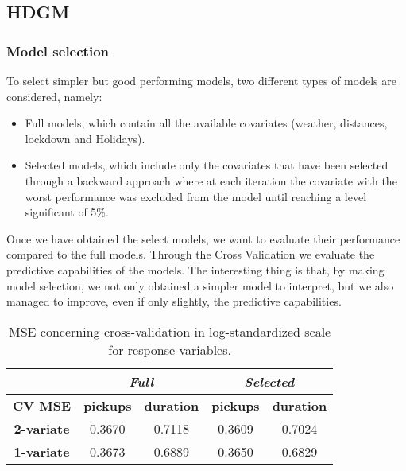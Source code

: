 \subsection{HDGM}
\subsubsection{Model selection} To select simpler but good performing models, two different types of models are considered, namely:
\begin{itemize}
	\item Full models, which contain all the available covariates (weather, distances, lockdown and Holidays).
	\item Selected models, which include only the covariates that have been selected through a backward approach where at each iteration the covariate with the worst performance was excluded from the model until reaching a level significant of \num{5}\%.
\end{itemize}
Once we have obtained the select models, we want to evaluate their performance compared to the full models. Through the Cross Validation we evaluate the predictive capabilities of the models. The interesting thing is that, by making model selection, we not only obtained a simpler model to interpret, but we also managed to improve, even if only slightly, the predictive capabilities.
 
\begin{table}[h!]
	\centering
	\renewcommand\arraystretch{1.3}
	\begin{tabular}{c|cc|cc}
		\hline
		\multicolumn{1}{l|}{} & \multicolumn{2}{c|}{\textit{Full}} & \multicolumn{2}{c}{\textit{Selected} }\\ 
		\hline
		\textbf{CV MSE} & \multicolumn{1}{c|}{\textbf{pickups }} & \textbf{duration} & \multicolumn{1}{c|}{\textbf{pickups}} & \textbf{duration} \\ 
		\hline
		\textbf{2-variate } & \multicolumn{1}{c|}{0.3670}  & 0.7118   & \multicolumn{1}{c|}{0.3609}  & 0.7024   \\ 
		\hline
		\textbf{1-variate } & \multicolumn{1}{c|}{0.3673}  & 0.6889   & \multicolumn{1}{c|}{0.3650}  & 0.6829   \\ 
		\hline
	\end{tabular}
	\caption[MSE concerning cross-validation in log-standardized scale for response variables (HDGM)]{MSE concerning cross-validation in log-standardized scale for response variables.}
	\label{Cross-validation mean squared errors HDGM}
\end{table}

